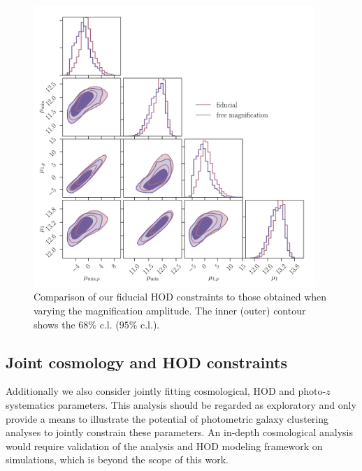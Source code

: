 \documentclass[a4paper,11pt]{article}
\begin{document}
    \begin{figure}
      \begin{center}
        \includegraphics[width=0.95\textwidth]{figures/contours-Mmin-M1_mPk=HOD_fix=alpha-fc-sigmaM_HOD=zevol_fit=pz-shifts+prior=0p2-pz-widths+prior=0p2_fit=auto+cross_cosmo=const-LINBIAS_HOD-param=zfid_clfit=HOD-zevol_no-mag-bias-vs-mag-bias-free.pdf}
        \caption{Comparison of our fiducial HOD constraints to those obtained when varying the magnification amplitude. The inner (outer) contour shows the $68 \%$ c.l. ($95 \%$ c.l.).}
        \label{fig:constraints-no-mag-bias-vs-fit=mag-bias-ampl}
      \end{center}
    \end{figure}

  \subsection{Joint cosmology and HOD constraints}\label{ssec:results.cosmo}
    Additionally we also consider jointly fitting cosmological, HOD and photo-$z$ systematics parameters. This analysis should be regarded as exploratory and only provide a means to illustrate the potential of photometric galaxy clustering analyses to jointly constrain these parameters. An in-depth cosmological analysis would require validation of the analysis and HOD modeling framework on simulations, which is beyond the scope of this work.
\end{document}
